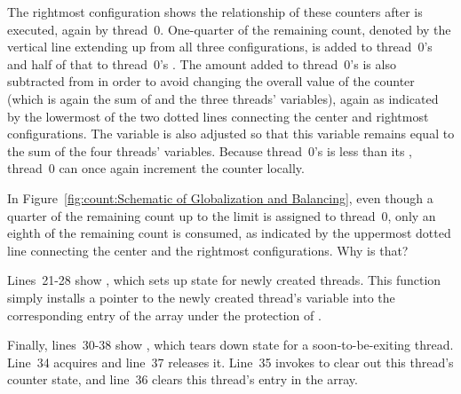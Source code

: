 The rightmost configuration shows the relationship of these counters
after  is executed, again by thread~0.
One-quarter of the remaining count, denoted by the vertical line extending
up from all three configurations, is added to thread~0's
 and half of that to thread~0's .
The amount added to thread~0's  is also subtracted from
 in order to avoid changing the overall value of the
counter (which is again the sum of  and the three
threads'  variables), again as indicated by the lowermost
of the two dotted lines connecting the center and rightmost configurations.
The  variable is also adjusted so that this variable
remains equal to the sum of the four threads' 
variables.
Because thread~0's  is less than its ,
thread~0 can once again increment the counter locally.

\QuickQuiz{}
	In Figure~\ref{fig:count:Schematic of Globalization and Balancing},
	even though a quarter of the remaining count up to the limit is
	assigned to thread~0, only an eighth of the remaining count is
	consumed, as indicated by the uppermost dotted line connecting
	the center and the rightmost configurations.
	Why is that?
 \QuickQuizEnd

Lines~21-28 show , which sets up state for
newly created threads.
This function simply installs
a pointer to the newly created thread's  variable into
the corresponding entry of the  array under the protection
of .

Finally, lines~30-38 show , which tears down
state for a soon-to-be-exiting thread.
Line~34 acquires  and line~37 releases it.
Line~35 invokes  to clear out this thread's
counter state, and line~36 clears this thread's entry in the
 array.

